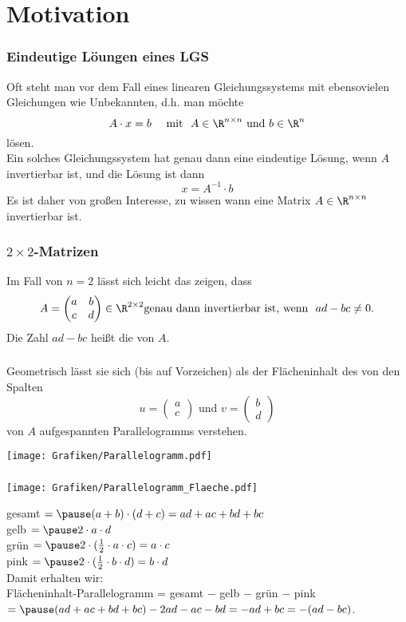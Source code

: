 \section{Motivation}
%
\begin{frame}\frametitle{Eindeutige Löungen eines LGS}
Oft steht man vor dem Fall eines linearen Gleichungssystems mit ebensovielen Gleichungen wie Unbekannten, d.h. man möchte 
$$ 
A\cdot x = b \quad \text{ mit } \ A \in \R^{n\times n} \text{ und } b\in \R^n
$$
lösen.\\\pause
Ein solches Gleichungssystem hat genau dann eine eindeutige Lösung, wenn $A$ invertierbar ist, und die Lösung ist dann
$$
x= A^{-1} \cdot b
$$
Es ist daher von großen Interesse, zu wissen wann eine Matrix $A \in \R^{n\times n}$ invertierbar ist. 
\end{frame}
%
%
\begin{frame}\frametitle{$2 \times 2$-Matrizen}

Im Fall von $n=2$  lässt sich leicht das zeigen, dass 
$$
A=\begin{pmatrix} a & b \\ c & d \end{pmatrix} \in \R^{2 \times 2} \text{genau dann invertierbar ist, wenn } \ ad-bc \ne 0.
$$
Die Zahl $ad-bc$ heißt die  von $A$.	
\end{frame}
%
%
\begin{frame}\frametitle{}
Geometrisch lässt sie sich (bis auf Vorzeichen) als der Flächeninhalt des von den Spalten
$$u=\begin{pmatrix} a  \\ c \end{pmatrix} \text{ und } v=\begin{pmatrix} b  \\ d \end{pmatrix}$$
von $A$ aufgespannten Parallelogramms verstehen.
	\begin{center}
		\texttt{[image: Grafiken/Parallelogramm.pdf]}
	\end{center}
\end{frame}
%
%
\begin{frame}\frametitle{}
	\begin{center}
		\texttt{[image: Grafiken/Parallelogramm\_Flaeche.pdf]}
	\end{center}
gesamt $= \pause (a+b)\cdot(d+c)=ad+ac+bd+bc$\\
gelb $= \pause 2 \cdot a\cdot d$\\
grün $= \pause 2\cdot(\frac{1}{2}\cdot a \cdot c)=a\cdot c$\\
pink $= \pause 2\cdot(\frac{1}{2}\cdot b \cdot d)=b\cdot d$\\\pause
\vfill
Damit erhalten wir:\\\pause\vfill
Flächeninhalt-Parallelogramm = gesamt $-$ gelb $-$ grün $-$ pink $= \pause(ad+ac+bd+bc)-2ad-ac-bd=-ad+bc=-(ad-bc)$.
\end{frame}
